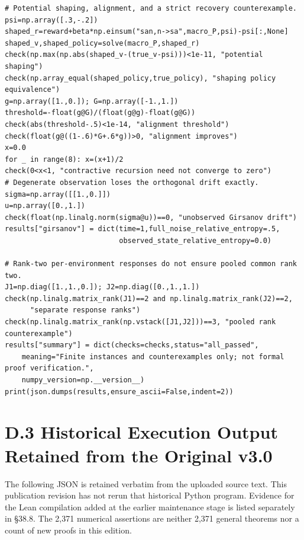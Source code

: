 \documentclass[
  english,
  11pt,
  oneside]{book}
\begin{document}
\begin{verbatim}
# Potential shaping, alignment, and a strict recovery counterexample.
psi=np.array([.3,-.2])
shaped_r=reward+beta*np.einsum("san,n->sa",macro_P,psi)-psi[:,None]
shaped_v,shaped_policy=solve(macro_P,shaped_r)
check(np.max(np.abs(shaped_v-(true_v-psi)))<1e-11, "potential shaping")
check(np.array_equal(shaped_policy,true_policy), "shaping policy equivalence")
g=np.array([1.,0.]); G=np.array([-1.,1.])
threshold=-float(g@G)/(float(g@g)-float(g@G))
check(abs(threshold-.5)<1e-14, "alignment threshold")
check(float(g@((1-.6)*G+.6*g))>0, "alignment improves")
x=0.0
for _ in range(8): x=(x+1)/2
check(0<x<1, "contractive recursion need not converge to zero")
# Degenerate observation loses the orthogonal drift exactly.
sigma=np.array([[1.,0.]])
u=np.array([0.,1.])
check(float(np.linalg.norm(sigma@u))==0, "unobserved Girsanov drift")
results["girsanov"] = dict(time=1,full_noise_relative_entropy=.5,
                           observed_state_relative_entropy=0.0)

# Rank-two per-environment responses do not ensure pooled common rank two.
J1=np.diag([1.,1.,0.]); J2=np.diag([0.,1.,1.])
check(np.linalg.matrix_rank(J1)==2 and np.linalg.matrix_rank(J2)==2,
      "separate response ranks")
check(np.linalg.matrix_rank(np.vstack([J1,J2]))==3, "pooled rank counterexample")
results["summary"] = dict(checks=checks,status="all_passed",
    meaning="Finite instances and counterexamples only; not formal proof verification.",
    numpy_version=np.__version__)
print(json.dumps(results,ensure_ascii=False,indent=2))
\end{verbatim}

\section{D.3 Historical Execution Output Retained from the Original v3.0}\label{d.3-historical-execution-output-retained-from-the-original-v3.0}

The following JSON is retained verbatim from the uploaded source text. This publication revision has not rerun that historical Python program. Evidence for the Lean compilation added at the earlier maintenance stage is listed separately in §38.8. The 2,371 numerical assertions are neither 2,371 general theorems nor a count of new proofs in this edition.
\end{document}
